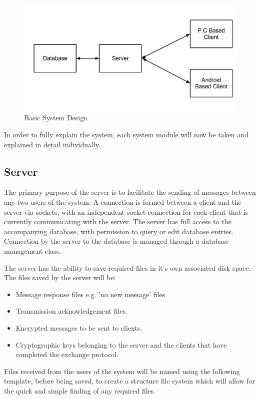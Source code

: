 \documentclass[a4paper,10pt]{report}
\begin{document}
\begin{figure}[htb]
\centering
\includegraphics[scale=0.4]{images/mainsystem1.jpg}
\caption{Basic System Design}
\label{fig:mainsystem1}
\end{figure}

In order to fully explain the system, each system module will now be taken and explained in detail individually. 

\subsection{Server}

The primary purpose of the server is to facilitate the sending of messages between any two users of the system. A connection is formed between a client and the server via sockets, with an independent socket connection for each client that is currently communicating with the server. The server has full access to the accompanying database, with permission to query or edit database entries. Connection by the server to the database is managed through a database management class. 

The server has the ability to save required files in it's own associated disk space. The files saved by the server will be:

\begin{itemize}
 \item Message response files e.g. 'no new message' files.
 \item Transmission acknowledgement files.
 \item Encrypted messages to be sent to clients.
 \item Cryptographic keys belonging to the server and the clients that have completed the exchange protocol. 
\end{itemize}

Files received from the users of the system will be named using the following template, before being saved, to create a structure file system which will allow for the quick and simple finding of any required files. 
\end{document}
